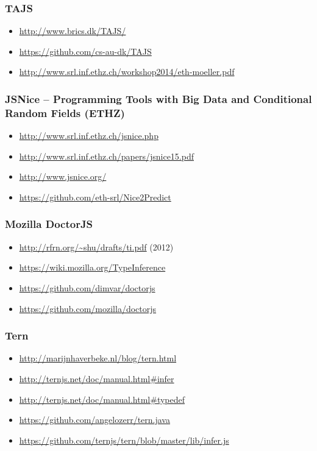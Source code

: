  \subsubsection{TAJS}
 \begin{itemize}
   \item \url{http://www.brics.dk/TAJS/}
   \item \url{https://github.com/cs-au-dk/TAJS}
   \item \url{http://www.srl.inf.ethz.ch/workshop2014/eth-moeller.pdf}
 \end{itemize}

 \subsubsection{JSNice -- Programming Tools with Big Data and Conditional Random Fields (ETHZ)}
 \begin{itemize}
   \item \url{http://www.srl.inf.ethz.ch/jsnice.php}
   \item \url{http://www.srl.inf.ethz.ch/papers/jsnice15.pdf}
   \item \url{http://www.jsnice.org/}
   \item \url{https://github.com/eth-srl/Nice2Predict}
 \end{itemize}

 \subsubsection{Mozilla DoctorJS}
 \begin{itemize}
 \item \url{http://rfrn.org/~shu/drafts/ti.pdf} (2012)
 \item \url{https://wiki.mozilla.org/TypeInference}
 \item \url{https://github.com/dimvar/doctorjs}
 \item \url{https://github.com/mozilla/doctorjs}
 \end{itemize}

 \subsubsection{Tern}
 \begin{itemize}
   \item \url{http://marijnhaverbeke.nl/blog/tern.html}
   \item \url{http://ternjs.net/doc/manual.html#infer}
   \item \url{http://ternjs.net/doc/manual.html#typedef}
   \item \url{https://github.com/angelozerr/tern.java}
   \item \url{https://github.com/ternjs/tern/blob/master/lib/infer.js}
 \end{itemize}

